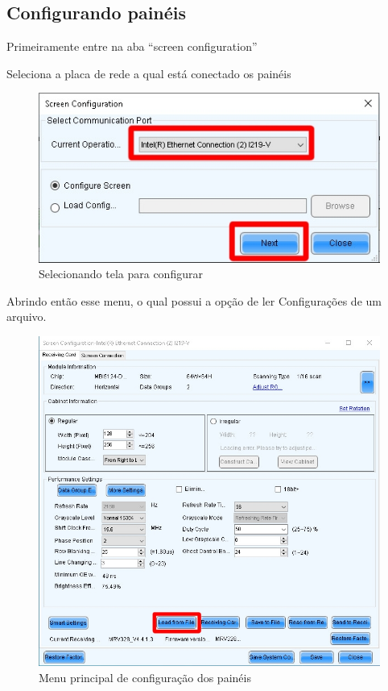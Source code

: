 \documentclass[12pt, a4paper]{article}
\begin{document}
\subsection{Configurando painéis}\label{Configurando painéis}
Primeiramente entre na aba ``screen configuration''

Seleciona a placa de rede a qual está conectado os painéis
\begin{figure}[!htb]
	\centering
	\includegraphics[width=\textwidth]{SC0.jpeg}
	\caption{\label{fig:SC0.jpeg}Selecionando tela para configurar}
\end{figure}

\newpage
Abrindo então esse menu, o qual possui a opção de ler Configurações de um arquivo.
\begin{figure}[!htb]
	\centering
	\includegraphics[width=\textwidth]{SC1.jpeg}
	\caption{\label{fig:SC1.jpeg}Menu principal de configuração dos painéis}
\end{figure}
\end{document}
